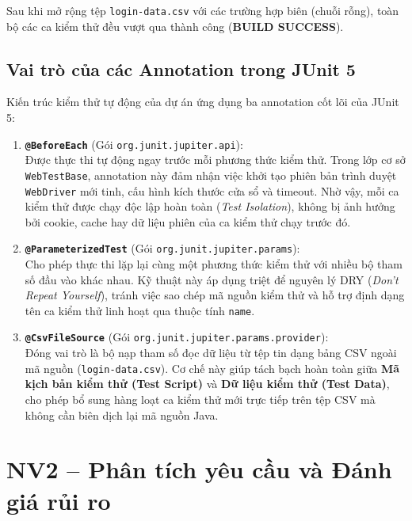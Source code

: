 \documentclass[a4paper]{article}
\begin{document}
Sau khi mở rộng tệp \texttt{login-data.csv} với các trường hợp biên (chuỗi rỗng), toàn bộ các ca kiểm thử đều vượt qua thành công (\textbf{BUILD SUCCESS}).

\subsection{Vai trò của các Annotation trong JUnit 5}
Kiến trúc kiểm thử tự động của dự án ứng dụng ba annotation cốt lõi của JUnit 5:
\begin{enumerate}[\bfseries a)]
  \item \textbf{\texttt{@BeforeEach}} (Gói \texttt{org.junit.jupiter.api}):\\
  Được thực thi tự động ngay trước mỗi phương thức kiểm thử. Trong lớp cơ sở \texttt{WebTestBase}, annotation này đảm nhận việc khởi tạo phiên bản trình duyệt \texttt{WebDriver} mới tinh, cấu hình kích thước cửa sổ và timeout. Nhờ vậy, mỗi ca kiểm thử được chạy độc lập hoàn toàn (\textit{Test Isolation}), không bị ảnh hưởng bởi cookie, cache hay dữ liệu phiên của ca kiểm thử chạy trước đó.
  
  \item \textbf{\texttt{@ParameterizedTest}} (Gói \texttt{org.junit.jupiter.params}):\\
  Cho phép thực thi lặp lại cùng một phương thức kiểm thử với nhiều bộ tham số đầu vào khác nhau. Kỹ thuật này áp dụng triệt để nguyên lý DRY (\textit{Don't Repeat Yourself}), tránh việc sao chép mã nguồn kiểm thử và hỗ trợ định dạng tên ca kiểm thử linh hoạt qua thuộc tính \texttt{name}.
  
  \item \textbf{\texttt{@CsvFileSource}} (Gói \texttt{org.junit.jupiter.params.provider}):\\
  Đóng vai trò là bộ nạp tham số đọc dữ liệu từ tệp tin dạng bảng CSV ngoài mã nguồn (\texttt{login-data.csv}). Cơ chế này giúp tách bạch hoàn toàn giữa \textbf{Mã kịch bản kiểm thử (Test Script)} và \textbf{Dữ liệu kiểm thử (Test Data)}, cho phép bổ sung hàng loạt ca kiểm thử mới trực tiếp trên tệp CSV mà không cần biên dịch lại mã nguồn Java.
\end{enumerate}

\clearpage
\section{NV2 – Phân tích yêu cầu và Đánh giá rủi ro}
\end{document}
